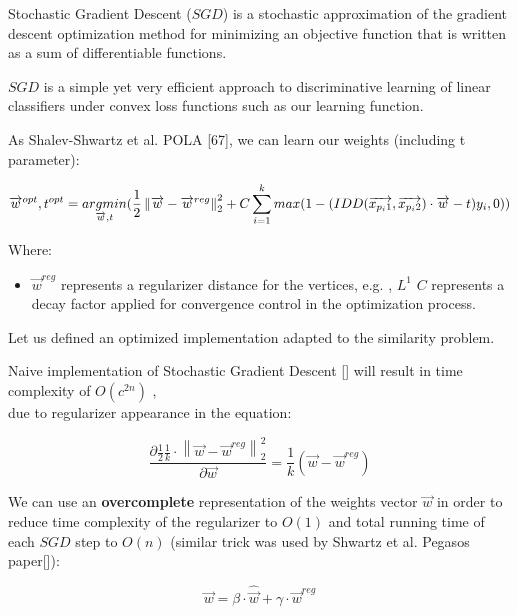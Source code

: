 Stochastic Gradient Descent ($SGD$) is a stochastic approximation of the gradient descent optimization method for minimizing an objective function that is written as a sum of differentiable functions.

$SGD$ is a simple yet very efficient approach to discriminative learning of linear classifiers under convex loss functions such as our learning function.

As Shalev-Shwartz et al. POLA [67], we can learn our weights (including t parameter):

\begin{equation}
\overrightarrow{w}^{opt} , t^{opt} =\\ 
\underset{\overrightarrow{w} , t}{argmin} (\frac{1}{2}\left \| \overrightarrow{w} - \overrightarrow{w}^{reg} \right \|_2^2 + C \sum_{i=1}^{k}max(1-(IDD(\overrightarrow{x_{p_i1}} , \overrightarrow{x_{p_i2}}) \cdot \overrightarrow{w} - t)y_i , 0)) \end{equation}



Where:
\begin{itemize}
		\item $\overrightarrow{w}^{reg}$ represents a regularizer distance for the vertices, e.g. , $L^1$
	\itehm $C$ represents a decay factor applied for convergence control in the optimization process.
\end{itemize}

Let us defined an optimized implementation adapted to the similarity problem.

Naive implementation of Stochastic Gradient Descent [] will result in time complexity of $O(c^{2n})$  , \\
due to regularizer appearance in the equation: 


\begin{equation}
\frac{\partial\frac{1}{2}\frac{1}{k}\cdot
	\left \|\overrightarrow{w} - \overrightarrow{w}^{reg}  \right \|_{2}^{2}
}{\partial \overrightarrow{w}}  = \frac{1}{k}(\overrightarrow{w} -  \overrightarrow{w}^{reg})
\end{equation}

We can use an \textbf{overcomplete} representation of the weights vector $\overrightarrow{w}$ in order to reduce time complexity of the regularizer to $O(1)$ and total running time of each $SGD$ step to $O(n)$ (similar trick was used by Shwartz et al. Pegasos paper[]):

\begin{equation}
\overrightarrow{w} = \beta\cdot\hat{\overrightarrow{w}} + \gamma \cdot \overrightarrow{w}^{reg}
\end{equation}

